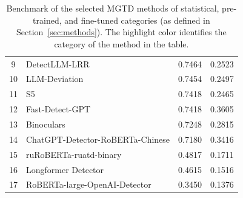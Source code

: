 \documentclass[letterpaper]{article} %
\begin{document}
\begin{table}[!t]
{\begin{tabular}{cm{6cm}@{}cc}
{\cellcolor[HTML]{F9CB9C}} 9 & {\cellcolor[HTML]{F9CB9C}} DetectLLM-LRR & {\cellcolor[HTML]{F9CB9C}} 0.7464 & {\cellcolor[HTML]{F9CB9C}} 0.2523 \\
{\cellcolor[HTML]{F9CB9C}} 10 & {\cellcolor[HTML]{F9CB9C}} LLM-Deviation & {\cellcolor[HTML]{F9CB9C}} 0.7454 & {\cellcolor[HTML]{F9CB9C}} 0.2497 \\
{\cellcolor[HTML]{F9CB9C}} 11 & {\cellcolor[HTML]{F9CB9C}} S5 & {\cellcolor[HTML]{F9CB9C}} 0.7418 & {\cellcolor[HTML]{F9CB9C}} 0.2465 \\
{\cellcolor[HTML]{F9CB9C}} 12 & {\cellcolor[HTML]{F9CB9C}} Fast-Detect-GPT & {\cellcolor[HTML]{F9CB9C}} 0.7418 & {\cellcolor[HTML]{F9CB9C}} 0.3605 \\
{\cellcolor[HTML]{F9CB9C}} 13 & {\cellcolor[HTML]{F9CB9C}} Binoculars & {\cellcolor[HTML]{F9CB9C}} 0.7248 & {\cellcolor[HTML]{F9CB9C}} 0.2815 \\
{\cellcolor[HTML]{9FC5E8}} 14 & {\cellcolor[HTML]{9FC5E8}} ChatGPT-Detector-RoBERTa-Chinese & {\cellcolor[HTML]{9FC5E8}} 0.7180 & {\cellcolor[HTML]{9FC5E8}} 0.3416 \\
{\cellcolor[HTML]{9FC5E8}} 15 & {\cellcolor[HTML]{9FC5E8}} ruRoBERTa-ruatd-binary & {\cellcolor[HTML]{9FC5E8}} 0.4817 & {\cellcolor[HTML]{9FC5E8}} 0.1711 \\
{\cellcolor[HTML]{9FC5E8}} 16 & {\cellcolor[HTML]{9FC5E8}} Longformer Detector & {\cellcolor[HTML]{9FC5E8}} 0.4615 & {\cellcolor[HTML]{9FC5E8}} 0.1516 \\
{\cellcolor[HTML]{9FC5E8}} 17 & {\cellcolor[HTML]{9FC5E8}} RoBERTa-large-OpenAI-Detector & {\cellcolor[HTML]{9FC5E8}} 0.3450 & {\cellcolor[HTML]{9FC5E8}} 0.1376 \\
\hline
\end{tabular}
}
\caption{Benchmark of the selected MGTD methods of \colorbox[HTML]{F9CB9C}{statistical}, \colorbox[HTML]{9FC5E8}{pre-trained}, and \colorbox[HTML]{B6D7A8}{fine-tuned} categories (as defined in Section~\ref{sec:methods}). The highlight color identifies the category of the method in the table.}
\label{tab:benchmark}
\end{table}
\end{document}

